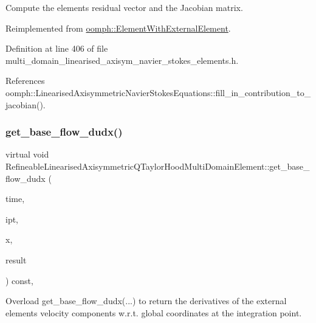 Compute the element\textquotesingle{}s residual vector and the Jacobian matrix. 



Reimplemented from \hyperlink{classoomph_1_1ElementWithExternalElement_ae5fb09552a8271e891438f8d058ca1b8}{oomph\+::\+Element\+With\+External\+Element}.



Definition at line 406 of file multi\+\_\+domain\+\_\+linearised\+\_\+axisym\+\_\+navier\+\_\+stokes\+\_\+elements.\+h.



References oomph\+::\+Linearised\+Axisymmetric\+Navier\+Stokes\+Equations\+::fill\+\_\+in\+\_\+contribution\+\_\+to\+\_\+jacobian().

\mbox{\label{classRefineableLinearisedAxisymmetricQTaylorHoodMultiDomainElement_ab93338e4fda9be14f7f1c34824ddc905}} 
\subsubsection{\texorpdfstring{get\+\_\+base\+\_\+flow\+\_\+dudx()}{get\_base\_flow\_dudx()}}
{\footnotesize\ttfamily virtual void Refineable\+Linearised\+Axisymmetric\+Q\+Taylor\+Hood\+Multi\+Domain\+Element\+::get\+\_\+base\+\_\+flow\+\_\+dudx (\begin{DoxyParamCaption}\item[{const double \&}]{time,  }\item[{const unsigned \&}]{ipt,  }\item[{const \hyperlink{classoomph_1_1Vector}{Vector}$<$ double $>$ \&}]{x,  }\item[{\hyperlink{classoomph_1_1DenseMatrix}{Dense\+Matrix}$<$ double $>$ \&}]{result }\end{DoxyParamCaption}) const\hspace{0.3cm}{\ttfamily [inline]}, {\ttfamily [virtual]}}



Overload get\+\_\+base\+\_\+flow\+\_\+dudx(...) to return the derivatives of the external element\textquotesingle{}s velocity components w.\+r.\+t. global coordinates at the integration point. 



